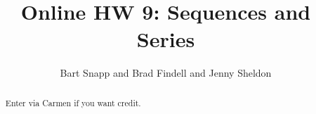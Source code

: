 \documentclass[handout,space,nooutcomes]{xourse}
\title{Online HW 9: Sequences and Series}
\author{Bart Snapp and Brad Findell and Jenny Sheldon}
\begin{document}
\begin{abstract}
Enter via Carmen if you want credit.   
\end{abstract}
\maketitle


\end{document}
